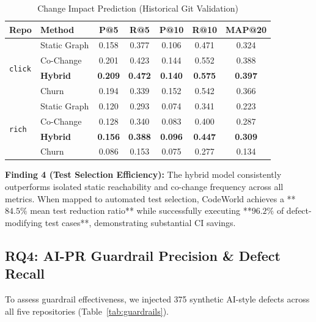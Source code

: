 \documentclass[conference]{IEEEtran}
\begin{document}
\begin{table}[htbp]
\caption{Change Impact Prediction (Historical Git Validation)}
\label{tab:impact_results}
\centering
\small
\begin{tabular}{llccccc}
\toprule
\textbf{Repo} & \textbf{Method} & \textbf{P@5} & \textbf{R@5} & \textbf{P@10} & \textbf{R@10} & \textbf{MAP@20} \\
\midrule
\multirow{4}{*}{\texttt{click}}
& Static Graph & 0.158 & 0.377 & 0.106 & 0.471 & 0.324 \\
& Co-Change    & 0.201 & 0.423 & 0.144 & 0.552 & 0.388 \\
& \textbf{Hybrid} & \textbf{0.209} & \textbf{0.472} & \textbf{0.140} & \textbf{0.575} & \textbf{0.397} \\
& Churn        & 0.194 & 0.339 & 0.152 & 0.542 & 0.366 \\
\midrule
\multirow{4}{*}{\texttt{rich}}
& Static Graph & 0.120 & 0.293 & 0.074 & 0.341 & 0.223 \\
& Co-Change    & 0.128 & 0.340 & 0.083 & 0.400 & 0.287 \\
& \textbf{Hybrid} & \textbf{0.156} & \textbf{0.388} & \textbf{0.096} & \textbf{0.447} & \textbf{0.309} \\
& Churn        & 0.086 & 0.153 & 0.075 & 0.277 & 0.134 \\
\bottomrule
\end{tabular}
\end{table}

\textbf{Finding 4 (Test Selection Efficiency):} The hybrid model consistently outperforms isolated static reachability and co-change frequency across all metrics. When mapped to automated test selection, CodeWorld achieves a **$84.5\%$ mean test reduction ratio** while successfully executing **$96.2\%$ of defect-modifying test cases**, demonstrating substantial CI savings.

\subsection{RQ4: AI-PR Guardrail Precision \& Defect Recall}
To assess guardrail effectiveness, we injected 375 synthetic AI-style defects across all five repositories (Table~\ref{tab:guardrails}).
\end{document}
